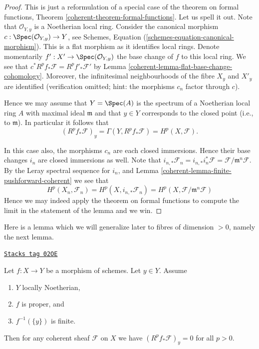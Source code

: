 \begin{proof}

This is just a reformulation of a special case of the theorem
on formal functions, Theorem \ref{coherent-theorem-formal-functions}.
Let us spell it out. Note that $\mathcal{O}_{Y, y}$ is a Noetherian
local ring. Consider the canonical morphism
$c : \Spec(\mathcal{O}_{Y, y}) \to Y$, see
Schemes, Equation (\ref{schemes-equation-canonical-morphism}).
This is a flat morphism as it identifies local rings.
Denote momentarily $f' : X' \to \Spec(\mathcal{O}_{Y, y})$
the base change of $f$ to this local ring. We see that
$c^*R^pf_*\mathcal{F} = R^pf'_*\mathcal{F}'$ by
Lemma \ref{coherent-lemma-flat-base-change-cohomology}.
Moreover, the infinitesimal neighbourhoods of
the fibre $X_y$ and $X'_y$ are identified (verification omitted; hint:
the morphisms $c_n$ factor through $c$).

\medskip\noindent
Hence we may assume that $Y = \Spec(A)$ is the spectrum of
a Noetherian local ring $A$ with maximal ideal $\mathfrak m$
and that $y \in Y$ corresponds to the closed point (i.e., to $\mathfrak m$).
In particular it follows that
$$
\left(R^pf_*\mathcal{F}\right)_y =
\Gamma(Y, R^pf_*\mathcal{F}) =
H^p(X, \mathcal{F}).
$$

\medskip\noindent
In this case also, the morphisms $c_n$ are each closed immersions.
Hence their base changes $i_n$ are closed immersions as well.
Note that $i_{n, *}\mathcal{F}_n = i_{n, *}i_n^*\mathcal{F}
= \mathcal{F}/\mathfrak m^n\mathcal{F}$. By the Leray spectral sequence
for $i_n$, and Lemma \ref{coherent-lemma-finite-pushforward-coherent} we see that
$$
H^p(X_n, \mathcal{F}_n) =
H^p(X, i_{n, *}\mathcal{F}_n) =
H^p(X, \mathcal{F}/\mathfrak m^n\mathcal{F})
$$
Hence we may indeed apply the theorem on formal functions to compute
the limit in the statement of the lemma and we win.
\end{proof}

Here is a lemma which we will generalize later to fibres of
dimension $ > 0$, namely the next lemma.

\begin{lemma}
\label{coherent-lemma-higher-direct-images-zero-finite-fibre}
\href{https://stacks.math.columbia.edu/tag/02OE}{\texttt{Stacks tag 02OE}}

Let $f : X \to Y$ be a morphism of schemes.
Let $y \in Y$.
Assume
\begin{enumerate}
\item $Y$ locally Noetherian,
\item $f$ is proper, and
\item $f^{-1}(\{y\})$ is finite.
\end{enumerate}
Then for any coherent sheaf $\mathcal{F}$ on $X$ we have
$(R^pf_*\mathcal{F})_y = 0$ for all $p > 0$.
\end{lemma}

